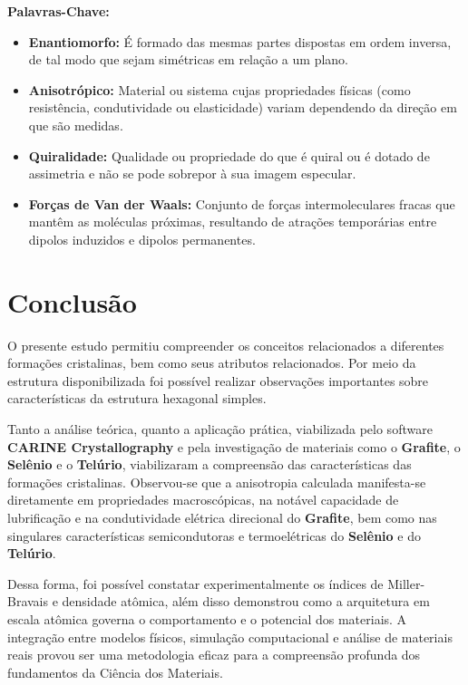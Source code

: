 \documentclass[10pt,twocolumn,letterpaper]{article}
\begin{document}
\begin{mdframed}
\textbf{\color{primaryBlue}Palavras-Chave:}
\begin{itemize}

    \item \textbf{Enantiomorfo:} É formado das mesmas partes dispostas em ordem inversa, de tal modo que sejam simétricas em relação a um plano. 
    \item \textbf{Anisotrópico:} Material ou sistema cujas propriedades físicas (como resistência, condutividade ou elasticidade) variam dependendo da direção em que são medidas.
    \item \textbf{Quiralidade:} Qualidade ou propriedade do que é quiral ou é dotado de assimetria e não se pode sobrepor à sua imagem especular.
    \item \textbf{Forças de Van der Waals:} Conjunto de forças intermoleculares fracas que mantêm as moléculas próximas, resultando de atrações temporárias entre dipolos induzidos e dipolos permanentes.
    
\end{itemize}
\end{mdframed}

\section{Conclusão}

\hspace{1cm} O presente estudo permitiu compreender os conceitos relacionados a diferentes formações cristalinas, bem como seus atributos relacionados. Por meio da estrutura disponibilizada foi possível realizar observações importantes sobre características da estrutura hexagonal simples.

\hspace{1cm} Tanto a análise teórica, quanto a aplicação prática, viabilizada pelo software \textbf{CARINE Crystallography} e pela investigação de materiais como o \textbf{Grafite}, o \textbf{Selênio} e o \textbf{Telúrio}, viabilizaram a compreensão das características das formações cristalinas. Observou-se que a anisotropia calculada manifesta-se diretamente em propriedades macroscópicas, na notável capacidade de lubrificação e na condutividade elétrica direcional do \textbf{Grafite}, bem como nas singulares características semicondutoras e termoelétricas do \textbf{Selênio} e do \textbf{Telúrio}.

\hspace{1cm} Dessa forma, foi possível constatar experimentalmente os índices de Miller-Bravais e densidade atômica, além disso demonstrou como a arquitetura em escala atômica governa o comportamento e o potencial dos materiais. A integração entre modelos físicos, simulação computacional e análise de materiais reais provou ser uma metodologia eficaz para a compreensão profunda dos fundamentos da Ciência dos Materiais.
\end{document}

